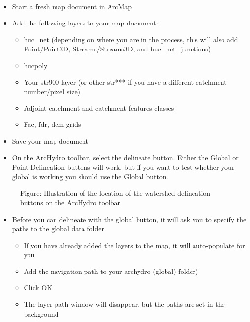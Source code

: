 \documentclass[letterpaper,10pt,english]{sphinxmanual}
\begin{document}
\paragraph{}
\label{\detokenize{ex_2:test-delineation}}\begin{itemize}
\item {} 
Start a fresh map document in ArcMap

\item {} 
Add the following layers to your map document:
\begin{itemize}
\item {} 
huc\_net (depending on where you are in the process, this will also add Point/Point3D, Streams/Streams3D, and huc\_net\_junctions)

\item {} 
hucpoly

\item {} 
Your str900 layer (or other str*** if you have a different catchment number/pixel size)

\item {} 
Adjoint catchment and catchment features classes

\item {} 
Fac, fdr, dem grids

\end{itemize}

\item {} 
Save your map document

\item {} 
On the ArcHydro toolbar, select the delineate button. Either the Global or Point Delineation buttons will work, but if you want to test whether your global is working you should use the Global button.

\end{itemize}

\begin{figure}[htbp]
\centering
\capstart

\noindent{}
\caption{Figure: Illustration of the location of the watershed delineation buttons on the ArcHydro toolbar}\label{\detokenize{ex_2:id43}}\end{figure}
\begin{itemize}
\item {} 
Before you can delineate with the global button, it will ask you to specify the paths to the global data folder
\begin{itemize}
\item {} 
If you have already added the layers to the map, it will auto-populate for you

\item {} 
Add the navigation path to your archydro (global) folder)

\item {} 
Click OK

\item {} 
The layer path window will disappear, but the paths are set in the background

\end{itemize}

\end{itemize}
\end{document}
